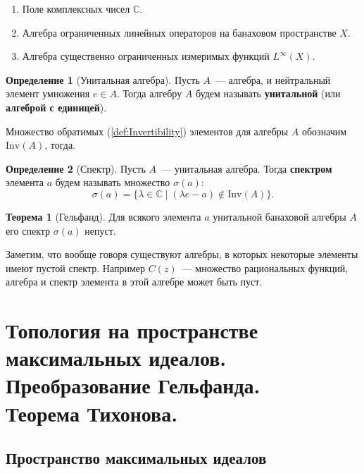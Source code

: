 \documentclass[12pt]{extarticle}
\theoremstyle{definition}
\newtheorem{theorem}{\indent Теорема}[section]
\newtheorem{definition}{\indent Определение}[section]
\begin{document}
        \begin{enumerate}
            \item Поле комплексных чисел $\mathbb{C}$.
            \item Алгебра ограниченных линейных операторов на банаховом пространстве $X$.
            \item Алгебра существенно ограниченных измеримых функций $L^\infty(X)$.
        \end{enumerate}

        \begin{definition}[Унитальная алгебра]\label{def:Unit algebra}
        Пусть $A$~--- алгебра, и нейтральный элемент умножения $e\in A$. Тогда алгебру $A$ будем называть \textbf{унитальной} (или \textbf{алгеброй с единицей}).
        \end{definition}
        Множество обратимых (\ref{def:Invertibility}) элементов для алгебры $A$ обозначим $\mathrm{Inv}(A)$, тогда.
        \begin{definition}[Спектр]\label{def:Spectrum}
            Пусть $A$~--- унитальная алгебра. Тогда \textbf{спектром} элемента $a$ будем называть множество $\sigma(a)$:
            \begin{equation*}
                \sigma(a) = \{\lambda \in \mathbb{C}\mid (\lambda e - a) \notin \mathrm{Inv}(A)\}.
            \end{equation*}
        \end{definition}
        \begin{theorem}[Гельфанд]\label{th:Gelfand}
            Для всякого элемента $a$ унитальной банаховой алгебры $A$ его спектр $\sigma(a)$ непуст.
        \end{theorem}
        Заметим, что вообще говоря существуют алгебры, в которых некоторые элементы имеют пустой спектр. Например $C(z)$~--- множество рациональных функций, алгебра и спектр элемента в этой алгебре может быть пуст.

    \section[Пространство максимальных идеалов]{Топология на пространстве максимальных идеалов. Преобразование Гельфанда.\\Теорема Тихонова.}
    \subsection{Пространство максимальных идеалов}
        
\end{document}
